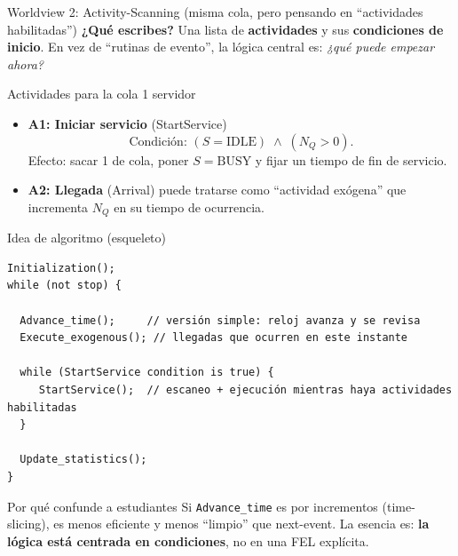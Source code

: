 \documentclass[aspectratio=1610, 9pt]{beamer}
\begin{document}
\begin{frame}[fragile]{Worldview 2: Activity-Scanning (misma cola, pero pensando en “actividades habilitadas”)}
\small
\textbf{¿Qué escribes?} Una lista de \textbf{actividades} y sus \textbf{condiciones de inicio}.  
En vez de “rutinas de evento”, la lógica central es: \emph{¿qué puede empezar ahora?}

\vspace{4pt}
\begin{block}{Actividades para la cola 1 servidor}
\begin{itemize}
\item \textbf{A1: Iniciar servicio} (StartService)
\[
\text{Condición: } (S=\text{IDLE})\;\wedge\;(N_Q>0).
\]
Efecto: sacar 1 de cola, poner $S=\text{BUSY}$ y fijar un tiempo de fin de servicio.
\item \textbf{A2: Llegada} (Arrival) puede tratarse como “actividad exógena” que incrementa $N_Q$ en su tiempo de ocurrencia.
\end{itemize}
\end{block}

\begin{block}{Idea de algoritmo (esqueleto)}
\end{block}
\begin{verbatim}
Initialization();
while (not stop) {

  Advance_time();     // versión simple: reloj avanza y se revisa
  Execute_exogenous(); // llegadas que ocurren en este instante

  while (StartService condition is true) {
     StartService();  // escaneo + ejecución mientras haya actividades habilitadas
  }

  Update_statistics();
}
\end{verbatim}

\begin{alertblock}{Por qué confunde a estudiantes}
Si \texttt{Advance\_time} es por incrementos (time-slicing), es menos eficiente y menos “limpio” que next-event.
La esencia es: \textbf{la lógica está centrada en condiciones}, no en una FEL explícita.
\end{alertblock}
\end{frame}
\end{document}
